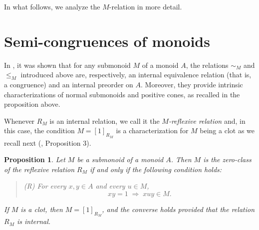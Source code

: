 \documentclass[12pt]{article}
\newtheorem{proposition}{Proposition}
\begin{document}
In what follows, we analyze the $M$-relation in more detail.


\section{Semi-congruences of monoids}

In \cite{MFS3}, it was shown that for any submonoid $M$ of a monoid $A$, the relations $\sim_M$ and $\leq_M$ introduced above are, respectively, an internal equivalence relation (that is, a congruence) and an internal preorder on $A$. Moreover, they provide intrinsic characterizations of normal submonoids and positive cones, as recalled in the proposition above. 

Whenever $R_M$ is an internal relation, we call it the \emph{$M$-reflexive relation} and, in this case, the condition  $M = [1]_{R_M}$ is a characterization for $M$ being a clot as we recall next (\cite{MFS3}, Proposition 3).



\begin{proposition}
 Let $M$ be a submonoid of a monoid $A$. Then $M$ is the zero-class of the reflexive relation $R_M$ if and only if the following condition holds:
\begin{quote}
(R) For every $x,y\in A$ and every $u\in M$,
\[
xy = 1 \;\Rightarrow\; xuy \in M.
\]
\end{quote}
If $M$ is a clot, then $M = [1]_{R_M}$, and the converse holds provided that the relation $R_M$ is internal.
\end{proposition}
\end{document}
